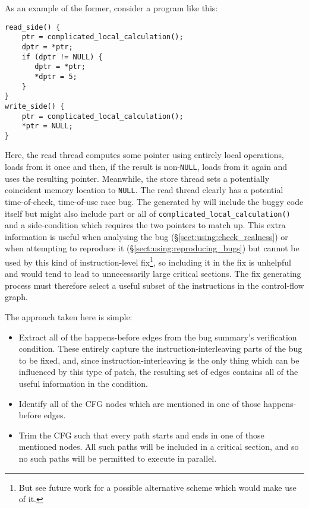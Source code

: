 
As an example of the former, consider a program like this:

\begin{verbatim}
read_side() {
    ptr = complicated_local_calculation();
    dptr = *ptr;
    if (dptr != NULL) {
       dptr = *ptr;
       *dptr = 5;
    }
}
write_side() {
    ptr = complicated_local_calculation();
    *ptr = NULL;
}
\end{verbatim}

Here, the read thread computes some pointer using entirely local
operations, loads from it once and then, if the result is
non-\verb|NULL|, loads from it again and uses the resulting pointer.
Meanwhile, the store thread sets a potentially coincident memory
location to \verb|NULL|.  The read thread clearly has a potential
time-of-check, time-of-use race bug.  The {\StateMachines} generated
by {\technique} will include the buggy code itself but might also
include part or all of \verb|complicated_local_calculation()| and a
side-condition which requires the two pointers to match up.  This
extra information is useful when analysing the bug
(\S\ref{sect:using:check_realness}) or when attempting to reproduce it
(\S\ref{sect:using:reproducing_bugs}) but cannot be used by this kind
of instruction-level fix\footnote{But see future work for a possible
  alternative scheme which would make use of it.}, so including it in
the fix is unhelpful and would tend to lead to unnecessarily large
critical sections.  The fix generating process must therefore select a
useful subset of the instructions in the control-flow graph.

The approach taken here is simple:

\begin{itemize}
\item
  Extract all of the happens-before edges from the bug summary's
  verification condition.  These entirely capture the
  instruction-interleaving parts of the bug to be fixed, and, since
  instruction-interleaving is the only thing which can be influenced
  by this type of patch, the resulting set of edges contains all of
  the useful information in the condition.
\item
  Identify all of the CFG nodes which are mentioned in one of those
  happens-before edges.
\item
  Trim the CFG such that every path starts and ends in one of those
  mentioned nodes.  All such paths will be included in a critical
  section, and so no such paths will be permitted to execute in
  parallel.
\end{itemize}

